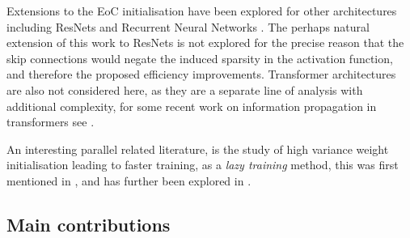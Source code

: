 \documentclass{article}
\theoremstyle{plain}
\theoremstyle{definition}
\theoremstyle{remark}
\begin{document}
Extensions to the EoC initialisation have been explored for other architectures including ResNets \cite{yang_mean_2017} and Recurrent Neural Networks \cite{xie_slow_2025}. The perhaps natural extension of this work to ResNets is not explored for the precise reason that the skip connections would negate the induced sparsity in the activation function, and therefore the proposed efficiency improvements. Transformer architectures are also not considered here, as they are a separate line of analysis with additional complexity, for some recent work on information propagation in transformers see \cite{cowsik_geometric_2024}.


 


 An interesting parallel related literature, is the study of high variance weight initialisation leading to faster training, as a \emph{lazy training} method, this was first mentioned in \cite{chizat_lazy_2019}, and has further been explored in \cite{domine_exact_2023, domine_lazy_2024}.



 

\subsection{Main contributions}
\end{document}
